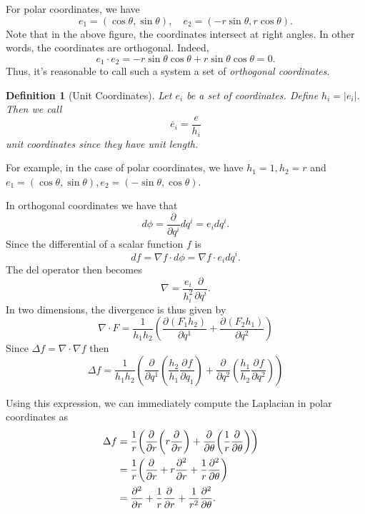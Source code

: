 \documentclass[12pt,letterpaper,boxed]{jhwhw}
\newtheorem{definition}{Definition}
\newcommand*{\pd}[3][]{\ensuremath{\frac{\partial^{#1} #2}{\partial #3}}}
\newcommand{\lrparen}[1]{{\left( #1 \right)}}
\newcommand{\abs}[1]{\left| #1 \right|}
\begin{document}
For polar coordinates, we have
\[
	e_1 = (\cos \theta, \sin \theta), \quad e_2 = (-r \sin \theta, r \cos \theta).
\]
Note that in the above figure, the coordinates intersect at right angles. In other words, the coordinates are orthogonal. Indeed,
\[
	e_1 \cdot e_2 = -r \sin \theta \cos \theta + r \sin \theta \cos \theta = 0.
\]
Thus, it's reasonable to call such a system a set of  \textit{orthogonal coordinates}. 
\begin{definition}[Unit Coordinates]
	Let $e_i$ be a set of coordinates. Define $h_i = \abs{e_i}$. Then we call
	\[
		\overline{e}_i = \frac{e}{h_i}
	\]
	unit coordinates since they have unit length.
\end{definition}
For example, in the case of polar coordinates, we have $h_1 = 1, h_2 = r$ and $e_1 = (\cos \theta, \sin \theta), e_2 = (-\sin \theta, \cos \theta)$.

In orthogonal coordinates we have that
\[
	d\phi = \pd{}{q^i} dq^i = e_i dq^i.
\]
Since the differential of a scalar function $f$ is
\[
	df = \nabla f \cdot d \phi = \nabla f \cdot e_i dq^i.
\]
The del operator then becomes
\[
	\nabla = \frac{e_i}{h_i^2} \pd{}{q^i}.
\]
In two dimensions, the divergence is thus given by
\[
	\nabla \cdot F = \frac{1}{h_1 h_2} \lrparen{ \pd{\lrparen{ F_1 h_2 }}{q^1}  + \pd{(F_2 h_1)}{q^2} }
\]
Since $\Delta f = \nabla \cdot \nabla f$ then
\[
	\Delta f = \frac{1}{h_1 h_2} \lrparen{ \pd{}{q^1} \lrparen{ \frac{h_2}{h_1} \pd{f}{q_1} } + \pd{}{q^2} \lrparen{ \frac{h_1}{h_2} \pd{f}{q^2}}}
\]

Using this expression, we can immediately compute the Laplacian in polar coordinates as
\[
	\begin{aligned}
		\Delta f &= \frac{1}{r} \lrparen{ \pd{}{r} \lrparen{ r \pd{}{r} } + \pd{}{\theta} \lrparen{ \frac{1}{r} \pd{}{\theta} }} \cr
		&= \frac{1}{r} \lrparen{ \pd{}{r} + r \pd[2]{}{r} + \frac{1}{r} \pd[2]{}{\theta} }\cr
		&= \pd[2]{}{r} + \frac{1}{r} \pd{}{r} + \frac{1}{r^2} \pd[2]{}{\theta}.
	\end{aligned}
\]
\end{document}
